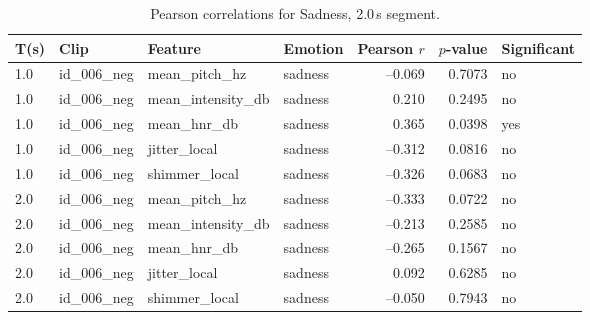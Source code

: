   \begin{table}[ht]
   
      \centering
      \caption{Pearson correlations for Sadness, 2.0\,s segment.}
      \label{tab:pearson_sadness_2s}
      \begin{tabular}{l l l l r r l}
        \toprule
        T(s) & Clip           & Feature             & Emotion & Pearson $r$ & $p$-value & Significant \\
        \midrule
        1.0 & id\_006\_neg & mean\_pitch\_hz     & sadness & –0.069 & 0.7073 & no  \\
      1.0 & id\_006\_neg & mean\_intensity\_db & sadness &  0.210 & 0.2495 & no  \\
      1.0 & id\_006\_neg & mean\_hnr\_db       & sadness &  0.365 & 0.0398 & yes \\
      1.0 & id\_006\_neg & jitter\_local       & sadness & –0.312 & 0.0816 & no  \\
      1.0 & id\_006\_neg & shimmer\_local      & sadness & –0.326 & 0.0683 & no  \\
        2.0 & id\_006\_neg & mean\_pitch\_hz     & sadness & –0.333 & 0.0722 & no \\
        2.0 & id\_006\_neg & mean\_intensity\_db & sadness & –0.213 & 0.2585 & no \\
        2.0 & id\_006\_neg & mean\_hnr\_db       & sadness & –0.265 & 0.1567 & no \\
        2.0 & id\_006\_neg & jitter\_local       & sadness &  0.092 & 0.6285 & no \\
        2.0 & id\_006\_neg & shimmer\_local      & sadness & –0.050 & 0.7943 & no \\
        \bottomrule
      \end{tabular}
    \end{table}%
    
